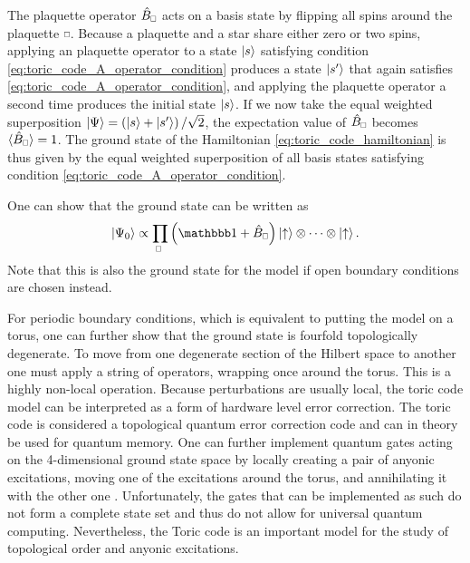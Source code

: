 The plaquette operator $\hat{B}_{\scalebox{0.6}{$\square$}}$ acts on a basis state by flipping all spins around the plaquette $\scalebox{0.6}{$\square$}$. Because a plaquette and a star share either zero or two spins, applying an plaquette operator to a state $\ket{s}$ satisfying condition \eqref{eq:toric_code_A_operator_condition} produces a state $\ket{s^\prime}$ that again satisfies \eqref{eq:toric_code_A_operator_condition}, and applying the plaquette operator a second time produces the initial state $\ket{s}$. If we now take the equal weighted superposition $\ket{\Psi} = \left(\ket{s}+\ket{s^\prime}\right)/\sqrt{2}$, the expectation value of $\hat{B}_{\scalebox{0.6}{$\square$}}$ becomes $\langle \hat{B}_{\scalebox{0.6}{$\square$}}\rangle = 1$.
The ground state of the Hamiltonian \eqref{eq:toric_code_hamiltonian} is thus given by the equal weighted superposition of all basis states satisfying condition \eqref{eq:toric_code_A_operator_condition}. \par
One can show that the ground state can be written as
\begin{equation}
	\ket{\Psi_0} \propto \prod_{\scalebox{0.6}{$\square$}}\left(\id + \hat{B}_{\scalebox{0.6}{$\square$}}\right) \ket{\uparrow} \otimes \dots \otimes \ket{\uparrow}.
\end{equation}
Note that this is also the ground state for the model if open boundary conditions are chosen instead. \par
For periodic boundary conditions, which is equivalent to putting the model on a torus, one can further show that the ground state is fourfold topologically degenerate. To move from one degenerate section of the Hilbert space to another one must apply a string of operators, wrapping once around the torus. This is a highly non-local operation. Because perturbations are usually local, the toric code model can be interpreted as a form of hardware level error correction. The toric code is considered a topological quantum error correction code and can in theory be used for quantum memory. One can further implement quantum gates acting on the 4-dimensional ground state space by locally creating a pair of anyonic excitations, moving one of the excitations around the torus, and annihilating it with the other one \cite{cite:fault_tolerant_quantum_computation_by_anyons}. Unfortunately, the gates that can be implemented as such do not form a complete state set and thus do not allow for universal quantum computing. Nevertheless, the Toric code is an important model for the study of topological order and anyonic excitations.
